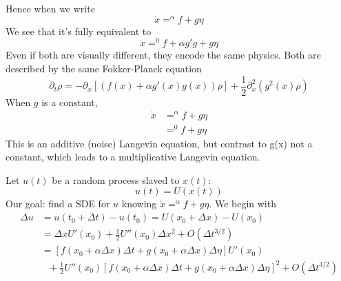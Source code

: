 \documentclass[a4paper]{book}
\theoremstyle{definition}
\theoremstyle{remark}
\begin{document}
Hence when we write 
\begin{equation}
    \dot{x} =^\alpha f + g\eta
\end{equation}
We see that it's fully equivalent to 
\begin{equation}
    \dot{x} =^0 f + \alpha g'g + g\eta
\end{equation}
Even if both are visually different, they encode the same physics. Both are described by the same Fokker-Planck equation 
\begin{equation}
    \partial_t \rho = -\partial_x [(f(x) + \alpha g'(x)g(x))\rho] + \frac{1}{2}\partial_x^2 (g^2(x)\rho)
\end{equation}
When $g$ is a constant,
\begin{equation}
    \begin{aligned}
        \dot{x} &=^\alpha  f + g\eta \\
        &=^0 f + g\eta
    \end{aligned}
\end{equation}
This is an additive (noise) Langevin equation, but contrast to g(x) not a constant, which leads to a multiplicative Langevin equation. \par \bigskip 

Let $u(t)$ be a random process slaved to $x(t)$:
\begin{equation}
    u(t) = U (x(t))
\end{equation}
Our goal: find a SDE for $u$ knowing $\dot{x} =^\alpha f + g\eta$. We begin with 
\begin{equation}
    \begin{aligned}
        \Delta u &= u(t_0 + \Delta t) - u(t_0) = U(x_0 + \Delta x) - U(x_0) \\
        &= \Delta x U'(x_0) + \frac{1}{2} U''(x_0)\Delta x^2 + O(\Delta t^{3/2}) \\
        &= [f(x_0 + \alpha \Delta x)\Delta t + g(x_0 + \alpha \Delta x)\Delta \eta]U'(x_0) \\
        &~~~+ \frac{1}{2}U''(x_0)[f(x_0 + \alpha \Delta x)\Delta t + g(x_0 + \alpha \Delta x)\Delta \eta]^2 + O(\Delta t^{3/2})
    \end{aligned}
\end{equation}
\end{document}
